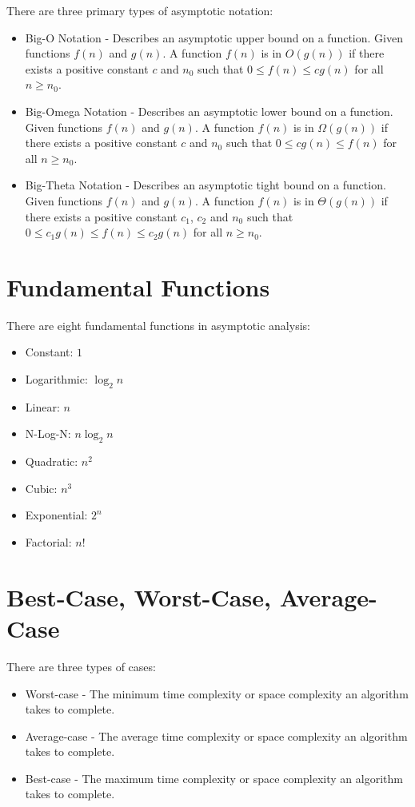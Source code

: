 There are three primary types of asymptotic notation:

\begin{itemize}
  \item Big-O Notation - Describes an asymptotic upper bound on a function.
    Given functions $f(n)$ and $g(n)$. A function $f(n)$ is in $O(g(n))$ if there exists a positive constant $c$ and $n_0$ such that $0 \le f(n) \le cg(n)$ for all $n \ge n_0$.
  \item Big-Omega Notation - Describes an asymptotic lower bound on a function.
    Given functions $f(n)$ and $g(n)$. A function $f(n)$ is in $\Omega(g(n))$ if there exists a positive constant $c$ and $n_0$ such that $0 \le cg(n) \le f(n)$ for all $n \ge n_0$.
  \item Big-Theta Notation - Describes an asymptotic tight bound on a function.
    Given functions $f(n)$ and $g(n)$. A function $f(n)$ is in $\Theta(g(n))$ if there exists a positive constant $c_1$, $c_2$ and $n_0$ such that $0 \le c_{1}g(n) \le f(n) \le c_{2}g(n)$ for all $n \ge n_0$.
\end{itemize}

\section{Fundamental Functions}
There are eight fundamental functions in asymptotic analysis:

\begin{itemize}
  \item Constant: $1$
  \item Logarithmic: $\log_{2}{n}$
  \item Linear: $n$
  \item N-Log-N: $n\log_{2}{n}$
  \item Quadratic: $n^2$
  \item Cubic: $n^3$
  \item Exponential: $2^n$
  \item Factorial: $n!$
\end{itemize}

\section{Best-Case, Worst-Case, Average-Case}

There are three types of cases:

\begin{itemize}
  \item Worst-case - The minimum time complexity or space complexity an algorithm takes to complete.
  \item Average-case - The average time complexity or space complexity an algorithm takes to complete.
  \item Best-case - The maximum time complexity or space complexity an algorithm takes to complete.
\end{itemize}

